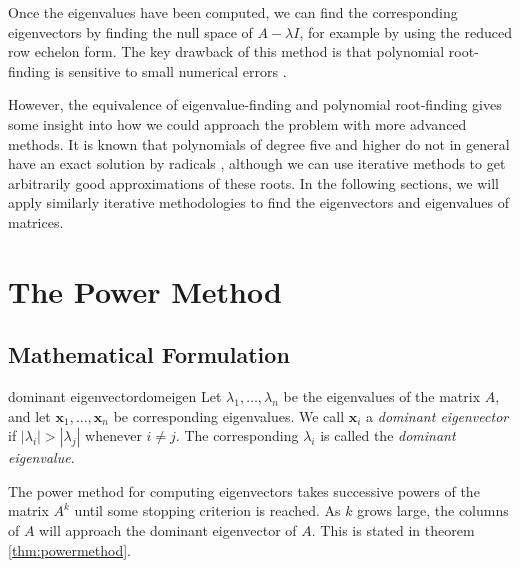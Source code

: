 \documentclass{article}
\let\vec\mathbf
\begin{document}
Once the eigenvalues have been computed, we can find the corresponding eigenvectors by finding the null space of $A - \lambda I$, for example by using the reduced row echelon form. The key drawback of this method is that polynomial root-finding is sensitive to small numerical errors \cite{spanish}.

However, the equivalence of eigenvalue-finding and polynomial root-finding gives some insight into how we could approach the problem with more advanced methods. It is known that polynomials of degree five and higher do not in general have an exact solution by radicals \cite{abel}, although we can use iterative methods to get arbitrarily good approximations of these roots. In the following sections, we will apply similarly iterative methodologies to find the eigenvectors and eigenvalues of matrices.

\section{The Power Method}
\subsection{Mathematical Formulation}
\begin{definition}{dominant eigenvector}{domeigen}
  Let $\lambda_1, \ldots, \lambda_n$ be the eigenvalues of the matrix $A$, and let $\vec{x}_1, \ldots, \vec{x}_n$ be corresponding eigenvalues. We call $\vec{x}_i$ a \textit{dominant eigenvector} if $|\lambda_i| > |\lambda_j|$ whenever $i \neq j$. The corresponding $\lambda_i$ is called the \textit{dominant eigenvalue}.
\end{definition}

The power method for computing eigenvectors takes successive powers of the matrix $A^k$ until some stopping criterion is reached. As $k$ grows large, the columns of $A$ will approach the dominant eigenvector of $A$. This is stated in theorem \ref{thm:powermethod}.
\end{document}
